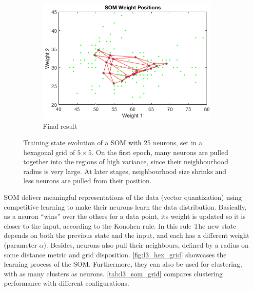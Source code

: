 \documentclass[a4paper, 10pt]{article}
\begin{document}
\begin{figure}[h]
\begin{adjustwidth}{-1cm}{-1cm}
\begin{subfigure}[t]{0.31\linewidth}
      \label{fig:l3_epoch1}
    \end{subfigure}
    \begin{subfigure}[t]{0.31\linewidth}
      \includegraphics[width=1\linewidth]{./lab3/SOM/epoch5_hex.png}
      \caption{Final result}
      \label{fig:l3_epoch5}
    \end{subfigure}
    \end{adjustwidth}
    \caption{Training state evolution of a SOM with 25 neurons, set in a 
    hexagonal grid of $5\times5$. On the first epoch, many neurons
    are pulled together into the regions of high variance, since their 
    neighbourhood radius is very large. At later stages, neighbourhood size 
    shrinks and less neurons are pulled from their position.}
    \label{fig:l3_hex_grid}
  \end{figure}

  SOM deliver meaningful representations of the data (vector quantization) using
  competitive learning to make their neurons learn the data distribution. 
  Basically, as a neuron “wins” over the others for a data point, its weight is
  updated so it is closer to the input, according to the Konohen rule. In this 
  rule The new state depends on both the previous state and the input, and each
  has a different weight (parameter $\alpha$). Besides, neurons also pull their
  neighbours, defined by a radius on some distance metric and grid disposition. 
  \autoref{fig:l3_hex_grid} showcases the learning process of the SOM. Furthermore,
  they can also be used for clustering, with as many clusters as neurons. 
  \autoref{tab:l3_som_grid} compares clustering performance with different 
  configurations.
\end{document}
